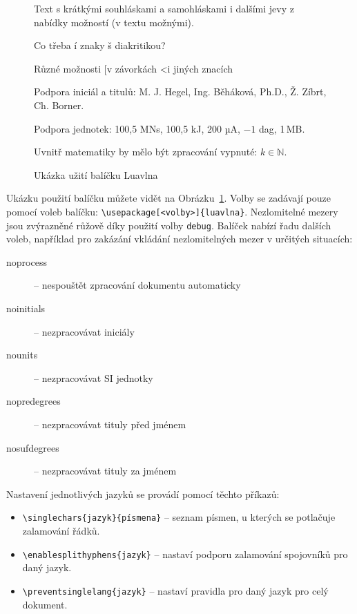 \documentclass{csbulletin}
\begin{document}
\begin{figure}
  \centering
  \begin{minipage}{3in}

    \preventsingledebugon

    Text s krátkými souhláskami a samohláskami i dalšími jevy
    z nabídky možností (v textu možnými).

    Co třeba í znaky š diakritikou?

    Různé možnosti [v závorkách \textless i jiných znacích

    Podpora iniciál a titulů: M. J. Hegel, Ing. Běháková, Ph.D., Ž. Zíbrt,
    Ch. Borner.

    Podpora jednotek: 100,5 MN\cdot{}s, 100,5 kJ, 200 µA, $-1$ dag, 1\,MB. 

    Uvnitř matematiky by mělo být zpracování vypnuté: $k \in \mathbb N$.

    \preventsingledebugoff
  \end{minipage}
  \caption{Ukázka užití balíčku Luavlna}\label{fig:luavlna}
\end{figure}


Ukázku použití balíčku můžete vidět na Obrázku~\ref{fig:luavlna}. 
Volby se zadávají pouze pomocí voleb balíčku: \verb|\usepackage[<volby>]{luavlna}|.
Nezlomitelné mezery jsou zvýrazněné růžově díky použití volby \texttt{debug}. Balíček
nabízí řadu dalších voleb, například pro zakázání vkládání nezlomitelných 
mezer v určitých situacích:

\begin{description}
  \item [noprocess] – nespouštět zpracování dokumentu automaticky
  \item [noinitials] – nezpracovávat iniciály
  \item [nounits] – nezpracovávat SI jednotky
  \item [nopredegrees] – nezpracovávat tituly před jménem
  \item [nosufdegrees] – nezpracovávat tituly za jménem
\end{description}

Nastavení jednotlivých jazyků se provádí pomocí těchto příkazů:

  \begin{itemize}
    \item\verb|\singlechars{jazyk}{písmena}| – seznam písmen, u kterých se potlačuje zalamování řádků.

    \item\verb|\enablesplithyphens{jazyk}| –  nastaví podporu zalamování spojovníků pro daný jazyk.
    \item\verb|\preventsinglelang{jazyk}| – nastaví pravidla pro daný jazyk pro celý dokument.
  \end{itemize}
\end{document}
